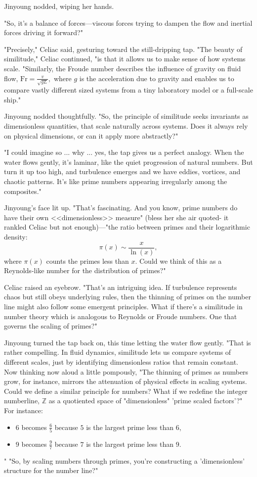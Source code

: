 Jinyoung nodded, wiping her hands. 

"So, it’s a balance of forces—viscous forces trying to dampen the flow and inertial forces driving it forward?"

"Precisely," Celiac said, gesturing toward the still-dripping tap. "The beauty of similitude," Celiac continued, "is that it allows us to make sense of how systems scale.  "Similarly, the Froude number describes the influence of gravity on fluid flow, 
\(
\text{Fr} = \frac{v}{\sqrt{gL}},
\)
where \(g\) is the acceleration due to gravity and enables us to compare vastly different sized systems from a tiny laboratory model or a full-scale ship."

Jinyoung nodded thoughtfully. "So, the principle of similitude seeks invariants as dimensionless quantities, that scale naturally across systems. Does it always rely on physical dimensions, or can it apply more abstractly?"

"I could imagine so ... why ... yes, the tap gives us a perfect analogy. When the water flows gently, it’s laminar, like the quiet progression of natural numbers. But turn it up too high, and turbulence emerges and we have eddies, vortices, and chaotic patterns. It’s like prime numbers appearing irregularly among the composites."

Jinyoung’s face lit up. "That’s fascinating. And you know, prime numbers do have their own <<dimensionless>> measure" (bless her she air quoted- it rankled Celiac but not enough)—"the ratio between primes and their logarithmic density:
\[
\pi(x) \sim \frac{x}{\ln(x)},
\]
where \(\pi(x)\) counts the primes less than \(x\). Could we think of this as a Reynolds-like number for the distribution of primes?"

Celiac raised an eyebrow. "That’s an intriguing idea. If turbulence represents chaos but still obeys underlying rules, then the thinning of primes on the number line might also follow some emergent principles. What if there’s a similitude in number theory which is analogous to Reynolds or Froude numbers. One that governs the scaling of primes?"

Jinyoung turned the tap back on, this time letting the water flow gently. "That is rather compelling. In fluid dynamics, similitude lets us compare systems of different scales, just by identifying dimensionless ratios that remain constant. Now thinking now aloud a little pompously, "The thinning of primes as numbers grow, for instance, mirrors the attenuation of physical effects in scaling systems. Could we define a similar principle for numbers? What if we redefine the integer numberline, \(\mathbb{Z}\) as a quotiented space of "dimensionless" 'prime scaled factors'?" For instance:
\begin{itemize}
    \item \(6\) becomes \(\frac{6}{5}\) because \(5\) is the largest prime less than \(6\),
    \item \(9\) becomes \(\frac{9}{7}\) because \(7\) is the largest prime less than \(9\).
\end{itemize}"
"So, by scaling numbers through primes, you’re constructing a 'dimensionless' structure for the number line?"

